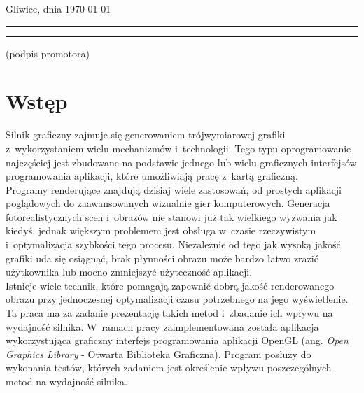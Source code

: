 \documentclass[a4paper,twoside,12pt]{book}
\newcommand{\obcy}[1]{\emph{#1}}
\newcommand{\ang}[1]{{\selectlanguage{british}\obcy{#1}}}
\newcounter{stronyPozaNumeracja}
\begin{document}
{\vfill



\vfill

Gliwice, dnia \today

\rule{0.5\textwidth}{0cm}\dotfill 

\rule{0.5\textwidth}{0cm}
\begin{minipage}{0.45\textwidth}
{\begin{center}(podpis promotora)\end{center}}
\end{minipage} 

\vfill

%
%
%

 

\cleardoublepage

}
\pagestyle{tylkoNumeryStron}
\tableofcontents

\setcounter{stronyPozaNumeracja}{\value{page}}
\mainmatter
\pagestyle{NumeryStronNazwyRozdzialow}


\chapter{Wstęp}

Silnik graficzny zajmuje się generowaniem trójwymiarowej grafiki z~wykorzystaniem wielu mechanizmów i~technologii. Tego typu oprogramowanie najczęściej jest zbudowane na podstawie jednego lub wielu graficznych interfejsów programowania aplikacji, które umożliwiają pracę z~kartą graficzną. \\
Programy renderujące znajdują dzisiaj wiele zastosowań, od prostych aplikacji poglądowych do zaawansowanych wizualnie gier komputerowych. Generacja fotorealistycznych scen i~obrazów nie stanowi już tak wielkiego wyzwania jak kiedyś, jednak większym problemem jest obsługa w~czasie rzeczywistym i~optymalizacja szybkości tego procesu. Niezależnie od tego jak wysoką jakość grafiki uda się osiągnąć, brak płynności obrazu może bardzo łatwo zrazić użytkownika lub mocno zmniejszyć użyteczność aplikacji. \\
Istnieje wiele technik, które pomagają zapewnić dobrą jakość renderowanego obrazu przy jednoczesnej optymalizacji czasu potrzebnego na jego wyświetlenie. Ta praca ma za zadanie prezentację takich metod i~zbadanie ich wpływu na wydajność silnika. W~ramach pracy zaimplementowana została aplikacja wykorzystująca graficzny interfejs programowania aplikacji OpenGL (ang. \ang{Open Graphics Library} - Otwarta Biblioteka Graficzna). Program posłuży do wykonania testów, których zadaniem jest określenie wpływu poszczególnych metod na wydajność silnika.
\end{document}
